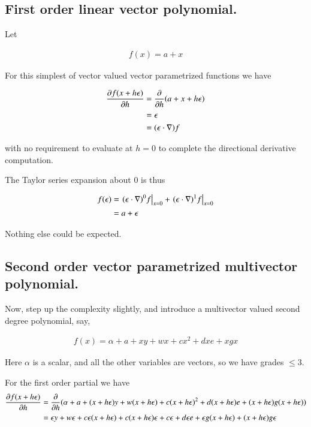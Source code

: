 \subsection{First order linear vector polynomial. }

Let

\begin{align*}
f(x) = a + x
\end{align*}

For this simplest of vector valued vector parametrized functions we have

\begin{align*}
\PD{h}{f(x + h \epsilon)} 
&= \PD{h}{} (a + x + h \epsilon) \\
&= \epsilon \\
&= (\epsilon \cdot \grad) f
\end{align*}

with no requirement to evaluate at $h=0$ to complete the directional derivative computation.

The Taylor series expansion about $0$ is thus

\begin{align*}
f(\epsilon) 
&= \left. (\epsilon \cdot \grad)^0 f \right\vert_{x=0} + \left. (\epsilon \cdot \grad)^1 f  \right\vert_{x=0} \\
&= a + \epsilon \\
\end{align*}

Nothing else could be expected.

\subsection{Second order vector parametrized multivector polynomial. }

Now, step up the complexity slightly, and introduce a multivector valued second degree polynomial, say,

\begin{align}\label{eqn:multivector_taylors:secondOrder}
f(x) = \alpha + a + x y + w x + c x^2 + d x e + x g x
\end{align}

Here $\alpha$ is a scalar, and all the other variables are vectors, so we have grades $\le 3$.

For the first order partial we have
\begin{align*}
\PD{h}{f(x + h \epsilon)} 
&= \PD{h}{} ( \alpha + a + (x + h\epsilon) y + w (x + h\epsilon) + c (x + h\epsilon)^2 + d (x + h\epsilon) e + (x + h\epsilon) g (x + h\epsilon) ) \\
&= 
\epsilon y 
+ w \epsilon
+ c \epsilon (x + h\epsilon) 
+ c (x + h\epsilon) \epsilon
+ c \epsilon 
+ d \epsilon e 
+ \epsilon g (x + h\epsilon) 
+ (x + h\epsilon) g \epsilon \\
\end{align*}

